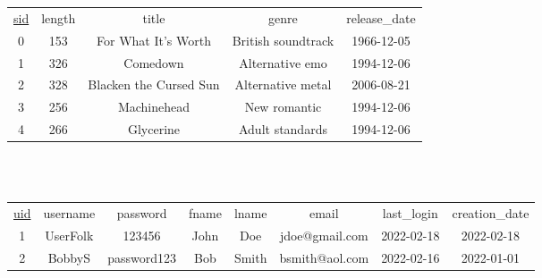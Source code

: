 \documentclass[12pt]{article}
\begin{document}
    \\~\\

    \begin{center}
        \begin{tabular}{ |c|c|c|c|c| }
            \hline
            \rowcolor{tablegrey} \multicolumn{5}{|c|}{Song} \\
            \hline
            \underline{sid} & length & title & genre & release\_date \\
            \hline
            0 & 153 & For What It's Worth & British soundtrack & 1966-12-05 \\
            \hline
            1 & 326 & Comedown & Alternative emo & 1994-12-06 \\
            \hline
            2 & 328 & Blacken the Cursed Sun & Alternative metal & 2006-08-21 \\
            \hline
            3 & 256 & Machinehead & New romantic & 1994-12-06 \\
            \hline
            4 & 266 & Glycerine & Adult standards & 1994-12-06 \\
            \hline
        \end{tabular}
    \end{center}

    \\~\\

    \begin{table}
        \scriptsize
        \begin{center}
            \begin{tabular}{ |c|c|c|c|c|c|c|c| }
                \hline
                \rowcolor{tablegrey} \multicolumn{8}{|c|}{User} \\
                \hline
                \underline{uid} & username & password & fname & lname & email & last\_login & creation\_date \\
                \hline
                1 & UserFolk & 123456 & John & Doe & jdoe@gmail.com & 2022-02-18 & 2022-02-18\\
                \hline
                2 & BobbyS & password123 & Bob & Smith & bsmith@aol.com & 2022-02-16 & 2022-01-01 \\
                \hline
            \end{tabular}
        \end{center}
    \end{table}

    \\~\\
\end{document}
